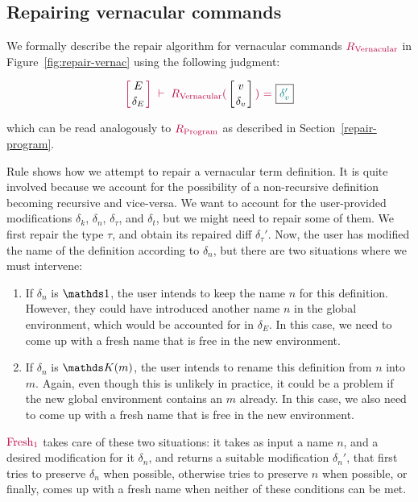 \subsection{Repairing vernacular commands} \label{repair-vernacular}

We formally describe the repair algorithm for vernacular commands
$\textcolor{purple}{R_{\text{Vernacular}}}$ in Figure~\ref{fig:repair-vernac} using the following
judgment:

{
  \[
    {\turnstile
      {\denv{E}{\delta_E}}
      {\repairVernac{v}{\delta_v}{\delta_v'}}
    }
  \]
}

\noindent which can be read analogously to $\textcolor{purple}{R_{\text{Program}}}$ as described in
Section~\ref{repair-program}.

Rule  shows how we attempt to repair a vernacular
term definition.  It is quite involved because we account for the possibility of
a non-recursive definition becoming recursive and vice-versa.  We want to
account for the user-provided modifications $\delta_k$, $\delta_n$,
$\delta_\tau$, and $\delta_t$, but we might need to repair some of them.  We
first repair the type $\tau$, and obtain its repaired diff $\delta_\tau'$.  Now,
the user has modified the name of the definition according to $\delta_n$, but
there are two situations where we must intervene:

\begin{enumerate}

\item If $\delta_n$ is $\MathSame$, the user intends to keep the name $n$ for
this definition.  However, they could have introduced another name $n$ in the
global environment, which would be accounted for in $\delta_E$.  In this case,
we need to come up with a fresh name that is free in the new environment.

\item If $\delta_n$ is $\MathReplace{m}$, the user intends to rename this
definition from $n$ into $m$.  Again, even though this is unlikely in practice,
it could be a problem if the new global environment contains an $m$ already.  In
this case, we also need to come up with a fresh name that is free in the new
environment.

\end{enumerate}

\noindent $\textcolor{purple}{\text{Fresh}_1}$ takes care of these two situations: it takes as input a
name $n$, and a desired modification for it $\delta_n$, and returns a suitable
modification $\delta_n'$, that first tries to preserve $\delta_n$ when possible,
otherwise tries to preserve $n$ when possible, or finally, comes up with a fresh
name when neither of these conditions can be met.

